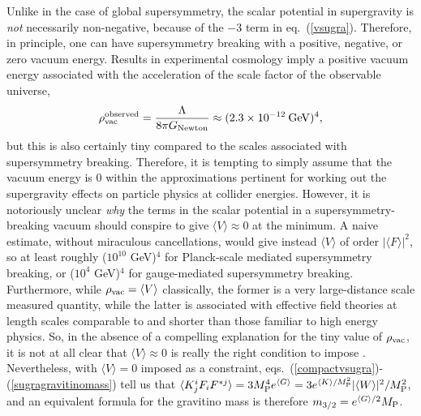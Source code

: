 \documentclass[12pt]{article}
\def\beq{\begin{eqnarray}}
\def\eeq{\end{eqnarray}}
\def\MPlanck{M_{\rm P}}
\begin{document}
Unlike in the case of global supersymmetry, the scalar potential in 
supergravity is {\it not} necessarily non-negative, because of the $-3$ 
term in eq.~(\ref{vsugra}). Therefore, in principle, one can have 
supersymmetry breaking with a positive, negative, or zero vacuum energy. 
Results in experimental cosmology \cite{cosmokramer} imply 
a positive vacuum energy associated with the acceleration of the
scale factor of the observable universe,
\beq
\rho_{\rm vac}^{\rm observed} = \frac{\Lambda}{8\pi G_{\rm Newton}} \approx 
(2.3 \times 10^{-12}\>{\rm GeV})^4,
\eeq
but this is also certainly tiny compared to the scales associated with 
supersymmetry breaking. Therefore, it is tempting to simply assume that 
the vacuum energy is 0 within the approximations pertinent for working out 
the supergravity effects on particle physics at collider energies. However, it 
is notoriously unclear {\em why} the terms in the scalar potential in a 
supersymmetry-breaking vacuum should conspire to give $\langle V \rangle 
\approx 0$ at the minimum.  A naive estimate, without miraculous 
cancellations, would give instead $ \langle V \rangle$ of order $|\langle F 
\rangle|^2$, so at least roughly ($10^{10}$ GeV)$^4$ for Planck-scale 
mediated supersymmetry breaking, or ($10^4$ GeV)$^4$ for gauge-mediated 
supersymmetry breaking. Furthermore, while $\rho_{\rm vac} = \langle V 
\rangle$ classically, the former is a very large-distance scale measured 
quantity, while the latter is associated with effective field theories at 
length scales comparable to and shorter than those familiar to high energy 
physics. So, in the absence of a compelling explanation for the tiny value 
of $\rho_{\rm vac}$, it is not at all clear that $\langle V \rangle 
\approx 0$ is really the right condition to impose \cite{cosmock}. 
Nevertheless, with $\langle V \rangle = 0$ imposed as a 
constraint, 
eqs.~(\ref{compactvsugra})-(\ref{sugragravitinomass}) tell us that $ 
\langle K_j^i F_i F^{*j} \rangle = 3 \MPlanck^4 e^{\langle G \rangle} = 3 
e^{\langle K \rangle/\MPlanck^2} |\langle W \rangle|^2/\MPlanck^2$, and an 
equivalent formula for the gravitino mass is therefore $m_{3/2} = 
e^{\langle G\rangle/2} \MPlanck$.
\end{document}

